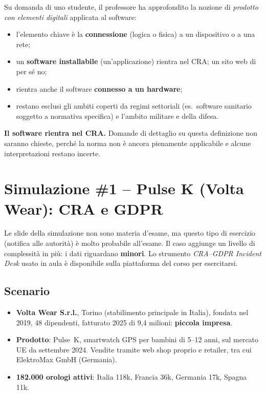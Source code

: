 Su domanda di uno studente, il professore ha approfondito la nozione di \emph{prodotto con elementi
digitali} applicata al software:
\begin{itemize}
  \item l'elemento chiave è la \textbf{connessione} (logica o fisica) a un dispositivo o a una rete;
  \item un \textbf{software installabile} (un'applicazione) rientra nel CRA; un sito web di per sé no;
  \item rientra anche il software \textbf{connesso a un hardware};
  \item restano esclusi gli ambiti coperti da regimi settoriali (es.\ software sanitario soggetto a
    normativa specifica) e l'ambito militare e della difesa.
\end{itemize}

\begin{esame}
\textbf{Il software rientra nel CRA.} Domande di dettaglio su questa definizione non saranno chieste,
perché la norma non è ancora pienamente applicabile e alcune interpretazioni restano incerte.
\end{esame}

\section{Simulazione \#1 -- Pulse K (Volta Wear): CRA e GDPR}
\label{sec:pulsek}

\begin{nota}
Le slide della simulazione non sono materia d'esame, ma questo tipo di esercizio (notifica alle
autorità) è molto probabile all'esame. Il caso aggiunge un livello di complessità in più: i dati
riguardano \textbf{minori}. Lo strumento \emph{CRA--GDPR Incident Desk} usato in aula è disponibile
sulla piattaforma del corso per esercitarsi.
\end{nota}

\subsection{Scenario}

\begin{itemize}
  \item \textbf{Volta Wear S.r.l.}, Torino (stabilimento principale in Italia), fondata nel 2019,
    48 dipendenti, fatturato 2025 di \texteuro{}9,4 milioni: \textbf{piccola impresa}.
  \item \textbf{Prodotto}: Pulse~K, smartwatch GPS per bambini di 5--12 anni, sul mercato UE da
    settembre 2024. Vendite tramite web shop proprio e retailer, tra cui ElektroMax GmbH (Germania).
  \item \textbf{182.000 orologi attivi}: Italia 118k, Francia 36k, Germania 17k, Spagna 11k.
\end{itemize}

